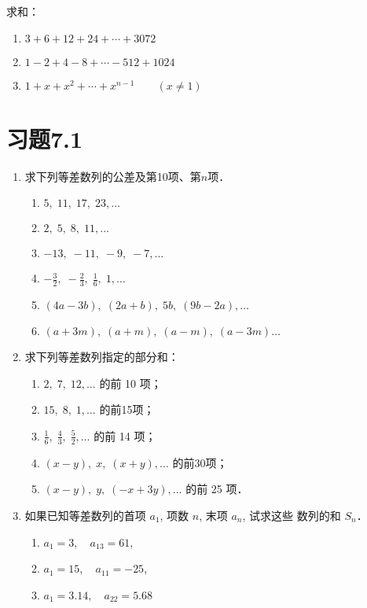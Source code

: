 \begin{ex}
    求和：
\begin{enumerate}
    \item $3+6+12+24+\cdots+3072$
    \item $1-2+4-8+\cdots-512+1024$
    \item $1+x+x^2+\cdots+x^{n-1}\qquad (x\ne 1)$
\end{enumerate}
\end{ex}

\section*{习题7.1}
\begin{enumerate}
    \item 求下列等差数列的公差及第10项、第$n$项．
\begin{enumerate}
    \item $5,\; 11,\; 17,\; 23, \ldots $
    \item $2,\; 5,\; 8,\; 11, \ldots $
    \item $-13,\; -11,\; -9,\; -7, \ldots $
    \item $-\frac{3}{2},\; -\frac{2}{3},\;  \frac{1}{6}, \; 1, \ldots $
    \item $(4 a-3 b),\; (2 a+b),\;  5 b,\; (9 b-2 a), \ldots$
    \item $(a+3 m),\; (a+m),\; (a-m),\; (a-3 m) \ldots $
\end{enumerate}
\item  求下列等差数列指定的部分和：
\begin{enumerate}
\item $2,\; 7,\; 12, \ldots $ 的前 10 项；
\item $15,\; 8,\;1, \ldots $ 的前15项；
\item $\frac{1}{6},\; \frac{4}{3},\; \frac{5}{2}, \ldots $ 的前 14 项；
\item $(x-y),\; x,\;(x+y), \ldots$ 的前30项；
\item $(x-y),\; y,\;(-x+3 y), \ldots$ 的前 25 项．
\end{enumerate}

\item  如果已知等差数列的首项 $a_{1}$, 项数 $n$, 末项 $a_{n}$, 试求这些 数列的和 $S_{n}$．
\begin{enumerate}
    \item  $a_{1}=3,\quad  a_{13}=61$,
    \item  $a_{1}=15,\quad  a_{11}=-25$,
    \item  $a_{1}=3.14,\quad  a_{22}=5.68$
\end{enumerate}


\end{enumerate}
